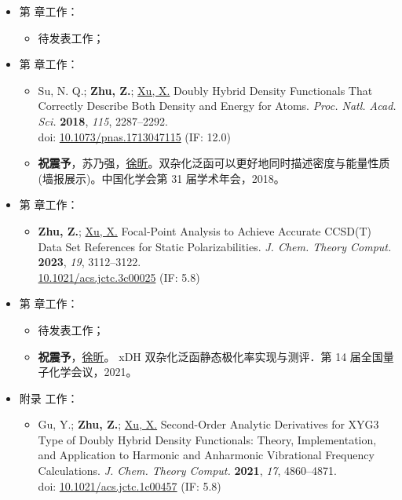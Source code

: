 \begin{itemize}[nosep]
    \item 第  章工作：
    \begin{itemize}[nosep]
        \item 待发表工作；
    \end{itemize}
    \item 第  章工作：
    \begin{itemize}[nosep]
        \item Su, N. Q.; \textbf{Zhu, Z.}; \underline{Xu, X.} Doubly Hybrid Density Functionals That Correctly Describe Both Density and Energy for Atoms. \textit{Proc. Natl. Acad. Sci.} \textbf{2018}, \textit{115}, 2287–2292. \\
        doi: \href{https://doi.org/10.1073/pnas.1713047115}{10.1073/pnas.1713047115}
        (IF: 12.0)
        \item \textbf{祝震予}，苏乃强，\underline{徐昕}。双杂化泛函可以更好地同时描述密度与能量性质 (墙报展示)。中国化学会第 31 届学术年会，2018。
    \end{itemize}
    \item 第  章工作：
    \begin{itemize}[nosep]
        \item \textbf{Zhu, Z.}; \underline{Xu, X.} Focal-Point Analysis to Achieve Accurate CCSD(T) Data Set References for Static Polarizabilities. \textit{J. Chem. Theory Comput.} \textbf{2023}, \textit{19}, 3112–3122.\\
        \href{https://doi.org/10.1021/acs.jctc.3c00025}{10.1021/acs.jctc.3c00025}
        (IF: 5.8)
    \end{itemize}
    \item 第  章工作：
    \begin{itemize}[nosep]
        \item 待发表工作；
        \item \textbf{祝震予}，\underline{徐昕}。 xDH 双杂化泛函静态极化率实现与测评．第 14 届全国量子化学会议，2021。
    \end{itemize}
    \item 附录  工作：
    \begin{itemize}[nosep]
        \item Gu, Y.; \textbf{Zhu, Z.}; \underline{Xu, X.} Second-Order Analytic Derivatives for XYG3 Type of Doubly Hybrid Density Functionals: Theory, Implementation, and Application to Harmonic and Anharmonic Vibrational Frequency Calculations. \textit{J. Chem. Theory Comput.} \textbf{2021}, \textit{17}, 4860–4871. \\
        doi: \href{https://doi.org/10.1021/acs.jctc.1c00457}{10.1021/acs.jctc.1c00457}
        (IF: 5.8)
    \end{itemize}
\end{itemize}

